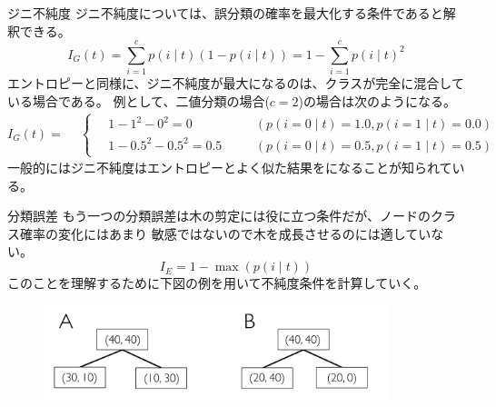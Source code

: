 \documentclass[aspectratio=169, dvipdfmx, 11pt]{beamer} %
\begin{document}
\begin{frame}{ジニ不純度}
    ジニ不純度については、誤分類の確率を最大化する条件であると解釈できる。
    \begin{equation*}
        I_G(t) = \sum_{i=1}^{c}p(i \mid t)(1-p(i \mid t)) = 1 - \sum_{i=1}^{c}p(i \mid t)^2
    \end{equation*}
    エントロピーと同様に、ジニ不純度が最大になるのは、クラスが完全に混合している場合である。
    例として、二値分類の場合(\(c=2\))の場合は次のようになる。
    \begin{equation*}
        I_G(t) = 
        \begin{aligned}
            & \left\{ \,
                \begin{aligned}
                    & 1 - 1^2 - 0^2 = 0 & \quad &(p(i=0 \mid t) = 1.0, p(i=1 \mid t) = 0.0) \\
                    & 1 - 0.5^2 - 0.5^2 = 0.5 & \quad &(p(i=0 \mid t) = 0.5, p(i=1 \mid t) = 0.5)
                \end{aligned}
            \right.
        \end{aligned}
    \end{equation*}
    一般的にはジニ不純度はエントロピーとよく似た結果をになることが知られている。
\end{frame}

\begin{frame}{分類誤差}
    もう一つの分類誤差は木の剪定には役に立つ条件だが、ノードのクラス確率の変化にはあまり
    敏感ではないので木を成長させるのには適していない。
    \begin{equation*}
        I_E = 1 - \max(p(i \mid t))
    \end{equation*}
    このことを理解するために下図の例を用いて不純度条件を計算していく。
    \begin{figure}[b]
        \begin{center}
        \includegraphics[width=100mm]{img/day03/fig02.png}
        \end{center}
    \end{figure}
\end{frame}
\end{document}
